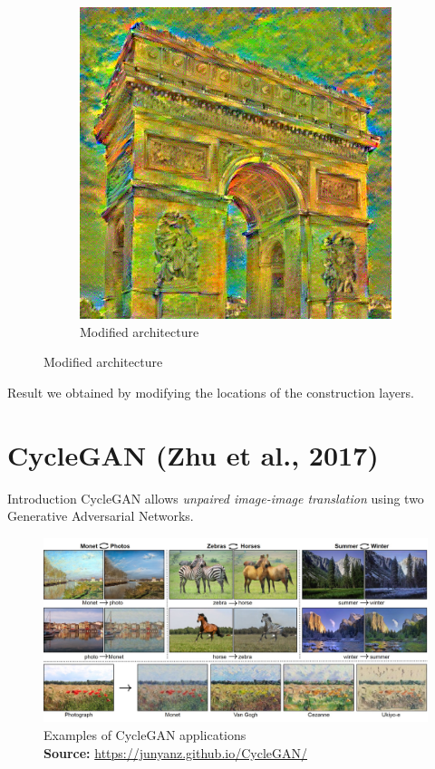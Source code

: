 \documentclass[12pt]{beamer}
\newcommand{\captionsource}[2]{
    \captionsetup{justification=centering}
    \caption*{#1\\\scriptsize\textbf{Source:} \url{#2}}
}
\begin{document}
\begin{frame}
\begin{figure}[H]
\begin{subfigure}[b]{0.45\textwidth}
                \includegraphics[width=\textwidth]{resources/gatys/layers/layers_nicer.png}
                \caption{Modified architecture}
            \end{subfigure}
        \end{figure}
        
        Result we obtained by modifying the locations of the construction layers.
    \end{frame}
    
    
    \section{CycleGAN (Zhu et al., 2017)}
    
    \begin{frame}{Introduction}
        CycleGAN allows \textit{unpaired image-image translation} using two Generative Adversarial Networks.
        
        \begin{figure}
            \centering
            \includegraphics[scale=0.3]{resources/cycle-gan/cyclegan-examples.jpeg}
            \captionsource{Examples of CycleGAN applications}{https://junyanz.github.io/CycleGAN/}
        \end{figure}
    \end{frame}
    
\end{document}
